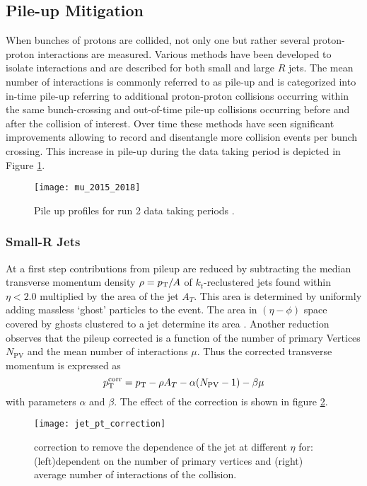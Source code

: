 \subsection{Pile-up Mitigation}
When bunches of protons are collided, not only one but rather several proton-proton interactions are measured. Various methods have been developed to isolate interactions and are described for both small and large $R$ jets. The mean number of interactions is commonly referred to as pile-up and is categorized into in-time pile-up referring to additional proton-proton collisions occurring within the same bunch-crossing and out-of-time pile-up collisions occurring before and after the collision of interest. Over time these methods have seen significant improvements allowing to record and disentangle more collision events per bunch crossing. This increase in pile-up during the data taking period is depicted in Figure \ref{fig:pileup}.
\begin{figure}
  \centering
  \texttt{[image: mu\_2015\_2018]}
  \caption[]{Pile up profiles for run 2 data taking periods \citep{pileup}.}
  \label{fig:pileup}
\end{figure}


\subsubsection{Small-R Jets}
At a first step contributions from pileup are reduced by subtracting the median transverse momentum density $\rho=p_{\text{T}} / A$ of $k_t$-reclustered jets found within $\eta<2.0$ multiplied by the area of the jet $A_T$. This area is determined by uniformly adding massless `ghost' particles to the event. The area in $(\eta-\phi)$ space covered by ghosts clustered to a jet determine its area \citep{ATLAS-CONF-2017-065}. Another reduction observes that the pileup corrected \pt is a function of the number of primary Vertices $N_\text{PV}$ and the mean number of interactions $\mu$. Thus the corrected transverse momentum is expressed as
\begin{equation}
  p_{\text{T}}^\text{corr}=p_{\text{T}}-\rho A_T -\alpha(N_\text{PV}-1)-\beta\mu
\end{equation}
with parameters $\alpha$ and $\beta$. The effect of the correction is shown in figure \ref{fig:jet_pt_correction}.
\begin{figure}
  \centering
  \texttt{[image: jet\_pt\_correction]}
  \caption[]{\pt correction to remove the \pt dependence of the jet at different $\eta$ for: (left)\pt dependent on the number of primary vertices and (right) average number of interactions of the collision.}
  \label{fig:jet_pt_correction}
\end{figure}

